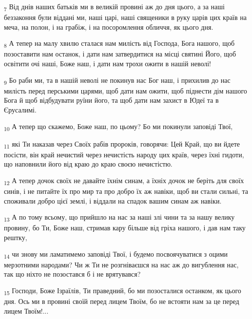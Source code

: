 \begin{tcolorbox}
\textsubscript{7} Від днів наших батьків ми в великій провині аж до дня цього, а за наші беззаконня були віддані ми, наші царі, наші священики в руку царів цих країв на меча, на полон, і на грабіж, і на посоромлення обличчя, як цього дня.
\end{tcolorbox}
\begin{tcolorbox}
\textsubscript{8} А тепер на малу хвилю сталася нам милість від Господа, Бога нашого, щоб позоставити нам останок, і дати нам затвердитися на місці святині Його, щоб освітити очі наші, Боже наш, і дати нам трохи ожити в нашій неволі!
\end{tcolorbox}
\begin{tcolorbox}
\textsubscript{9} Бо раби ми, та в нашій неволі не покинув нас Бог наш, і прихилив до нас милість перед перськими царями, щоб дати нам ожити, щоб піднести дім нашого Бога й щоб відбудувати руїни його, та щоб дати нам захист в Юдеї та в Єрусалимі.
\end{tcolorbox}
\begin{tcolorbox}
\textsubscript{10} А тепер що скажемо, Боже наш, по цьому? Бо ми покинули заповіді Твої,
\end{tcolorbox}
\begin{tcolorbox}
\textsubscript{11} які Ти наказав через Своїх рабів пророків, говорячи: Цей Край, що ви йдете посісти, він край нечистий через нечистість народу цих країв, через їхні гидоти, що наповнили його від краю до краю своєю нечистістю.
\end{tcolorbox}
\begin{tcolorbox}
\textsubscript{12} А тепер дочок своїх не давайте їхнім синам, а їхніх дочок не беріть для своїх синів, і не питайте їх про мир та про добро їх аж навіки, щоб ви стали сильні, та споживали добро цієї землі, і віддали на спадок вашим синам аж навіки.
\end{tcolorbox}
\begin{tcolorbox}
\textsubscript{13} А по тому всьому, що прийшло на нас за наші злі чини та за нашу велику провину, бо Ти, Боже наш, стримав кару більше від гріха нашого, і дав нам таку рештку,
\end{tcolorbox}
\begin{tcolorbox}
\textsubscript{14} чи знову ми ламатимемо заповіді Твої, і будемо посвоячуватися з оцими мерзотними народами? Чи ж Ти не розгніваєшся на нас аж до вигублення нас, так що ніхто не позостався б і не врятувався?
\end{tcolorbox}
\begin{tcolorbox}
\textsubscript{15} Господи, Боже Ізраїлів, Ти праведний, бо ми позосталися останком, як цього дня. Ось ми в провині своїй перед лицем Твоїм, бо не встояти нам за це перед лицем Твоїм!...
\end{tcolorbox}
